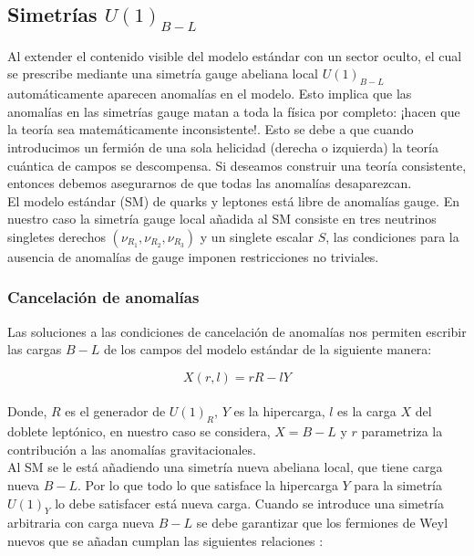 \documentclass[12pt]{article}
\begin{document}
\subsection{Simetrías $U(1)_{B-L}$ } 

Al extender el contenido visible del modelo estándar con un sector oculto, el cual se prescribe mediante una simetría gauge abeliana local $U(1)_{B-L}$ automáticamente aparecen anomalías en el modelo. Esto implica que las anomalías en las simetrías gauge matan a toda la física por completo: ¡hacen que la teoría sea matemáticamente inconsistente!. Esto se debe a que cuando introducimos un fermión de una sola helicidad (derecha o izquierda) la teoría cuántica de campos se descompensa. Si deseamos construir una teoría consistente, entonces debemos asegurarnos de que todas las anomalías desaparezcan. \\ 


El modelo estándar (SM) de quarks y leptones está libre de anomalías gauge. En nuestro  caso la simetría gauge local añadida al SM consiste en tres  neutrinos singletes derechos $(\nu_{R_1},\nu_{R_2}, \nu_{R_3} )$ y un singlete escalar $S$, las condiciones para la ausencia de anomalías de gauge imponen restricciones no triviales. \\ 




\subsubsection{Cancelación de anomalías}

Las soluciones a las condiciones de cancelación de anomalías nos permiten escribir las cargas $B-L$ de los campos del modelo estándar de la siguiente manera\cite{Restrepo}:  

\begin{equation}
 X (r,l)=rR-lY   
\end{equation} \\

Donde, $R$ es el generador de $U(1)_R$, $Y $ es la hipercarga, $l$ es la carga $X$ del doblete leptónico, en nuestro caso se considera, $X={B-L}$ y $r$ parametriza la contribución a las anomalías gravitacionales. \\

Al SM se le está añadiendo una simetría nueva abeliana local, que tiene carga nueva ${B-L}$. Por lo que todo lo que satisface la hipercarga ${Y}$ para la simetría $U(1)_Y$ lo debe satisfacer está nueva carga. Cuando se introduce una simetría arbitraria con carga nueva ${B-L}$ se debe garantizar que los fermiones de Weyl nuevos que se añadan cumplan las siguientes relaciones \cite{Restrepo}:
\end{document}
